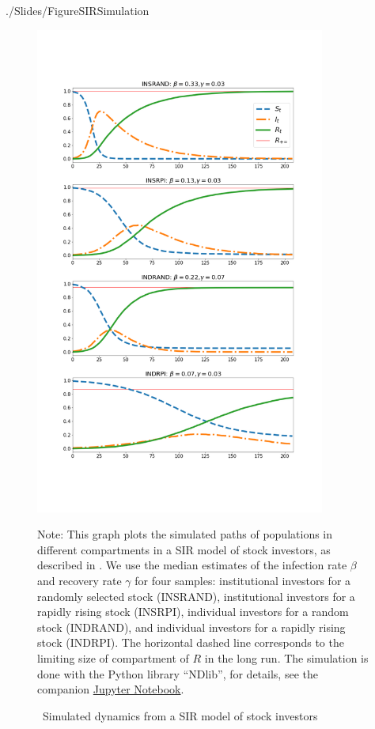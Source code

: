 \newpage

\begin{verbatimwrite}{./Slides/FigureSIRSimulation}%
\begin{figure}[!ht] \centering  %
	\caption{ ~Simulated dynamics from a SIR model of stock investors}
	\label{fig:sir_simulate}
	\includegraphics[width=0.85\textwidth,height=0.85\textheight]{./figures/sir_simulate}
	\begin{flushleft}
	{\footnotesize Note: This graph plots the simulated paths of populations in different compartments in a SIR model of stock investors, as described in \cite{shiller1989survey}. We use the median estimates of the infection rate $\beta$ and recovery rate $\gamma$ for four samples: institutional investors for a randomly selected stock (INSRAND), institutional investors for a rapidly rising stock (INSRPI), individual investors for a random stock (INDRAND), and individual investors for a rapidly rising stock (INDRPI). The horizontal dashed line corresponds to the limiting size of compartment of $R$ in the long run. The simulation is done with the Python library ``NDlib'', for details, see the companion \href{https://github.com/llorracc/EpiExp/blob/master/SIR_Ndlib.ipynb}{Jupyter Notebook}. }
				\end{flushleft}
\end{figure}
\end{verbatimwrite}%

